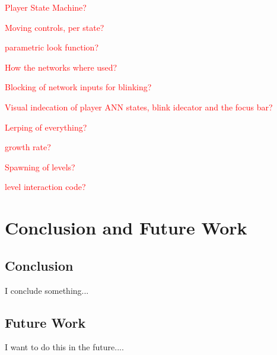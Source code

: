 \documentclass[11pt, a4paper]{article}
\newcommand{\commentintext}[1]
{\hfill 

\textcolor{red}{#1} 
	
\hfill
}
\begin{document}
\commentintext{Player State Machine?}
\commentintext{Moving controls, per state?}
\commentintext{parametric look function?}
\commentintext{How the networks where used?}
\commentintext{Blocking of network inputs for blinking?}
\commentintext{Visual indecation of player ANN states, blink idecator and the focus bar?}
\commentintext{Lerping of everything?}
\commentintext{growth rate?}

\commentintext{Spawning of levels?}
\commentintext{level interaction code?}



















\pagebreak
\section{Conclusion and Future Work}

\subsection{Conclusion}
I conclude something...


\subsection{Future Work}			%
I want to do this in the future....



\pagebreak
\printbibliography[notkeyword = software, title = References]

\pagebreak
\printbibliography[keyword = software, title = Software]
\end{document}
